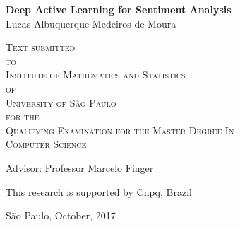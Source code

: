 \documentclass[11pt,oneside,a4paper]{book}
\begin{document}
\frontmatter 
\fancyhead[RO]{{\footnotesize\rightmark}\hspace{2em}\thepage}
\setcounter{tocdepth}{2}
\fancyhead[LE]{\thepage\hspace{2em}\footnotesize{\leftmark}}
\fancyhead[RE,LO]{}
\fancyhead[RO]{{\footnotesize\rightmark}\hspace{2em}\thepage}

\onehalfspacing  %

\thispagestyle{empty}
\begin{center}
    \vspace*{2.3cm}
    \textbf{\Large{Deep Active Learning for Sentiment Analysis}}\\
    
    \vspace*{1.2cm}
    \Large{Lucas Albuquerque Medeiros de Moura}
    
    \vskip 2cm
    \textsc{
    Text submitted\\[-0.25cm] 
    to\\[-0.25cm]
    Institute of Mathematics and Statistics\\[-0.25cm]
    of\\[-0.25cm]
    University of São Paulo\\[-0.25cm]
    for the\\[-0.25cm]
    Qualifying Examination for the Master Degree In\\[-0.25cm]
    Computer Science}
    
    \vskip 1.5cm
    Advisor: Professor Marcelo Finger

    \vskip 1cm
    \normalsize{This research is supported by Cnpq, Brazil}
    
    \vskip 0.5cm
    \normalsize{São Paulo, October, 2017}
\end{center}

%
%
%
\end{document}
